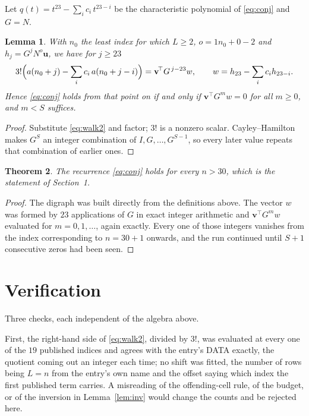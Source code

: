\documentclass[11pt,a4paper]{article}
\theoremstyle{plain}
\newtheorem{theorem}{Theorem}
\newtheorem{lemma}[theorem]{Lemma}
\theoremstyle{definition}
\begin{document}
Let $q(t)=t^{23}-\sum_i c_i\,t^{23-i}$ be the characteristic polynomial of
\eqref{eq:conj} and $G=N$.

\begin{lemma}\label{lem:crit}
With $n_0$ the least index for which $L\ge2$, $o=1n_0+0-2$ and
$h_j=G^{j}N^{o}\mathbf{u}$, we have for $j\ge23$
\[
3!\Bigl(a(n_0+j)-\sum_i c_i\,a(n_0+j-i)\Bigr)=\mathbf{v}^{\!\top}G^{\,j-23}w,
\qquad w=h_{23}-\sum_i c_i h_{23-i} .
\]
Hence \eqref{eq:conj} holds from that point on if and only if
$\mathbf{v}^{\!\top}G^{m}w=0$ for all $m\ge0$, and $m<S$ suffices.
\end{lemma}

\begin{proof}
Substitute \eqref{eq:walk2} and factor; $3!$ is a nonzero scalar. Cayley--Hamilton
makes $G^{S}$ an integer combination of $I,G,\dots,G^{S-1}$, so every later value repeats
that combination of earlier ones.
\end{proof}

\begin{theorem}
The recurrence \eqref{eq:conj} holds for every $n>30$, which is the statement of
Section~1.
\end{theorem}

\begin{proof}
The digraph was built directly from the definitions above. The vector $w$ was formed by
$23$ applications of $G$ in exact integer arithmetic and $\mathbf{v}^{\!\top}G^{m}w$
evaluated for $m=0,1,\dots$, again exactly. Every one of those integers vanishes from the
index corresponding to $n=30+1$ onwards, and the run continued until $S+1$ consecutive
zeros had been seen.
\end{proof}

\section{Verification}

Three checks, each independent of the algebra above.

First, the right-hand side of \eqref{eq:walk2}, divided by $3!$, was evaluated at every
one of the $19$ published indices and agrees with the entry's DATA exactly, the quotient
coming out an integer each time; no shift was fitted, the number of rows being
$L=n$ from the entry's own name and the offset saying which index the first published
term carries. A misreading of the offending-cell rule, of the budget, or of the inversion in
Lemma~\ref{lem:inv} would change the counts and be rejected here.
\end{document}

